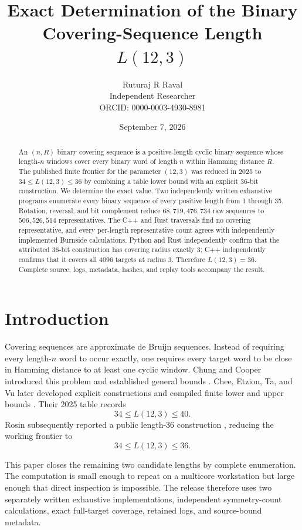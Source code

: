 \documentclass[11pt]{article}
\title{Exact Determination of the Binary Covering-Sequence Length
\(L(12,3)\)}
\author{Ruturaj R Raval\\Independent Researcher\\
ORCID: 0000-0003-4930-8981}
\date{September 7, 2026}
\begin{document}
\maketitle

\begin{abstract}
An \((n,R)\) binary covering sequence is a positive-length cyclic binary
sequence whose length-\(n\) windows cover every binary word of length \(n\)
within Hamming distance \(R\). The published finite frontier for the
parameter \((12,3)\) was reduced in 2025 to
\(34\leq L(12,3)\leq 36\) by combining a table lower bound with an explicit
36-bit construction. We determine the exact value. Two independently written
exhaustive programs enumerate every binary sequence of every positive length
from 1 through 35. Rotation, reversal, and bit complement reduce
\(68{,}719{,}476{,}734\) raw sequences to \(506{,}526{,}514\)
representatives. The C++ and Rust traversals find no covering representative,
and every per-length representative count agrees with independently
implemented Burnside calculations. Python and Rust independently confirm
that the attributed 36-bit construction has covering radius exactly 3; C++
independently confirms that it covers all 4096 targets at radius 3. Therefore
\(L(12,3)=36\). Complete source, logs, metadata, hashes, and replay tools
accompany the result.
\end{abstract}

\section{Introduction}

Covering sequences are approximate de Bruijn sequences. Instead of requiring
every length-\(n\) word to occur exactly, one requires every target word to be
close in Hamming distance to at least one cyclic window. Chung and Cooper
introduced this problem and established general bounds
\cite{chung-cooper}. Chee, Etzion, Ta, and Vu later developed explicit
constructions and compiled finite lower and upper bounds
\cite{chee-etzion-ta-vu}. Their 2025 table records
\[
  34\leq L(12,3)\leq 40.
\]
Rosin subsequently reported a public length-36 construction
\cite{rosin}, reducing the working frontier to
\[
  34\leq L(12,3)\leq 36.
\]

This paper closes the remaining two candidate lengths by complete
enumeration. The computation is small enough to repeat on a multicore
workstation but large enough that direct inspection is impossible. The
release therefore uses two separately written exhaustive implementations,
independent symmetry-count calculations, exact full-target coverage, retained
logs, and source-bound metadata.
\end{document}
